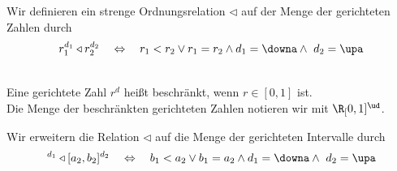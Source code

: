 
\begin{dfn}
    Wir definieren ein strenge Ordnungsrelation $\triangleleft$ auf der Menge der gerichteten Zahlen durch
    \begin{align*}
        r_1^{d_1} \triangleleft r_2^{d_2} \quad \Leftrightarrow \quad r_1 < r_2 \lor r_1 = r_2 \land d_1 = \downa \land \ d_2 = \upa
    \end{align*}
\end{dfn}

\begin{dfn}\ \\
    Eine gerichtete Zahl $r^d$ heißt beschränkt, wenn $r \in [0,1]$ ist.\\
    Die Menge der beschränkten gerichteten Zahlen notieren wir mit $\R_[0,1]^\ud$.
\end{dfn}



\begin{dfn}
    Wir erweitern die Relation $\triangleleft$ auf die Menge der gerichteten Intervalle durch
    \begin{align*}
        [a_1,b_1]^{d_1} \triangleleft [a_2,b_2]^{d_2} \quad \Leftrightarrow \quad b_1 < a_2 \lor b_1 = a_2 \land d_1 = \downa \land \ d_2 = \upa
    \end{align*}
\end{dfn}






